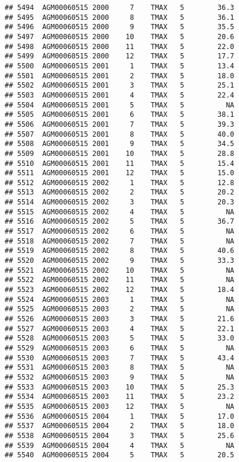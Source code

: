 \documentclass{article}\usepackage[]{graphicx}\usepackage[]{color}
\makeatletter
\newenvironment{kframe}{%
 \def\at@end@of@kframe{}%
 \ifinner\ifhmode%
  \def\at@end@of@kframe{\end{minipage}}%
  \begin{minipage}{\columnwidth}%
 \fi\fi%
 \def\FrameCommand##1{\hskip\@totalleftmargin \hskip-\fboxsep
 \colorbox{shadecolor}{##1}\hskip-\fboxsep
     \hskip-\linewidth \hskip-\@totalleftmargin \hskip\columnwidth}%
 \MakeFramed {\advance\hsize-\width
   \@totalleftmargin\z@ \linewidth\hsize
   \@setminipage}}%
 {\par\unskip\endMakeFramed%
 \at@end@of@kframe}
\newenvironment{knitrout}{}{} %
\makeatother
\begin{document}
\begin{knitrout}
\begin{kframe}
\begin{verbatim}
## 5494  AGM00060515 2000     7    TMAX   5        36.3
## 5495  AGM00060515 2000     8    TMAX   5        36.1
## 5496  AGM00060515 2000     9    TMAX   5        35.5
## 5497  AGM00060515 2000    10    TMAX   5        20.6
## 5498  AGM00060515 2000    11    TMAX   5        22.0
## 5499  AGM00060515 2000    12    TMAX   5        17.7
## 5500  AGM00060515 2001     1    TMAX   5        13.4
## 5501  AGM00060515 2001     2    TMAX   5        18.0
## 5502  AGM00060515 2001     3    TMAX   5        25.1
## 5503  AGM00060515 2001     4    TMAX   5        22.4
## 5504  AGM00060515 2001     5    TMAX   5          NA
## 5505  AGM00060515 2001     6    TMAX   5        38.1
## 5506  AGM00060515 2001     7    TMAX   5        39.3
## 5507  AGM00060515 2001     8    TMAX   5        40.0
## 5508  AGM00060515 2001     9    TMAX   5        34.5
## 5509  AGM00060515 2001    10    TMAX   5        28.8
## 5510  AGM00060515 2001    11    TMAX   5        15.4
## 5511  AGM00060515 2001    12    TMAX   5        15.0
## 5512  AGM00060515 2002     1    TMAX   5        12.8
## 5513  AGM00060515 2002     2    TMAX   5        20.2
## 5514  AGM00060515 2002     3    TMAX   5        20.3
## 5515  AGM00060515 2002     4    TMAX   5          NA
## 5516  AGM00060515 2002     5    TMAX   5        36.7
## 5517  AGM00060515 2002     6    TMAX   5          NA
## 5518  AGM00060515 2002     7    TMAX   5          NA
## 5519  AGM00060515 2002     8    TMAX   5        40.6
## 5520  AGM00060515 2002     9    TMAX   5        33.3
## 5521  AGM00060515 2002    10    TMAX   5          NA
## 5522  AGM00060515 2002    11    TMAX   5          NA
## 5523  AGM00060515 2002    12    TMAX   5        18.4
## 5524  AGM00060515 2003     1    TMAX   5          NA
## 5525  AGM00060515 2003     2    TMAX   5          NA
## 5526  AGM00060515 2003     3    TMAX   5        21.6
## 5527  AGM00060515 2003     4    TMAX   5        22.1
## 5528  AGM00060515 2003     5    TMAX   5        33.0
## 5529  AGM00060515 2003     6    TMAX   5          NA
## 5530  AGM00060515 2003     7    TMAX   5        43.4
## 5531  AGM00060515 2003     8    TMAX   5          NA
## 5532  AGM00060515 2003     9    TMAX   5          NA
## 5533  AGM00060515 2003    10    TMAX   5        25.3
## 5534  AGM00060515 2003    11    TMAX   5        23.2
## 5535  AGM00060515 2003    12    TMAX   5          NA
## 5536  AGM00060515 2004     1    TMAX   5        17.0
## 5537  AGM00060515 2004     2    TMAX   5        18.0
## 5538  AGM00060515 2004     3    TMAX   5        25.6
## 5539  AGM00060515 2004     4    TMAX   5          NA
## 5540  AGM00060515 2004     5    TMAX   5        20.5

\end{verbatim}
\end{kframe}
\end{knitrout}
\end{document}
